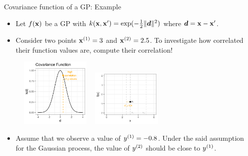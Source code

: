 \begin{frame}[c,allowframebreaks]{Covariance function of a GP: Example}


\begin{itemize}
\item Let $f(\mathbf{x})$ be a GP with $k(\mathbf{x}, \mathbf{x}^\prime) = \exp(-\frac{1}{2}\|\bm{d}\|^2)$ where $\bm{d} = \mathbf{x} - \mathbf{x}^\prime$.

\vspace{.3cm}

\item Consider two points $\mathbf{x}^{(1)} = 3$ and $\mathbf{x}^{(2)} = 2.5$. To investigate how correlated their function values are, compute their correlation!
\end{itemize}

\vspace{.3cm}

\begin{figure}
\includegraphics[width=0.3\textwidth]{figure_man/covariance2point/example_covariance_1.png} ~
\includegraphics[width=0.3\textwidth]{figure_man/covariance2point/example_function_1-1.png}
\end{figure}

\framebreak


\begin{itemize}
  \item Assume that we observe a value of $y^{(1)} = - 0.8$. Under the said assumption for the Gaussian process, the value of $y^{(2)}$ should be close to $y^{(1)}$.
\end{itemize}
\vspace{1cm}


\end{frame}
